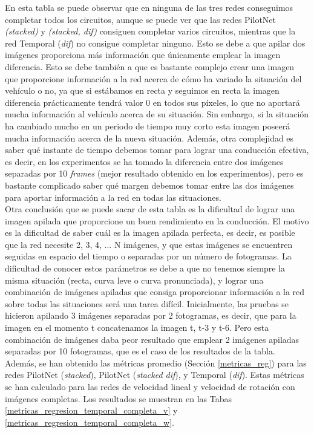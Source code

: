 En esta tabla se puede observar que en ninguna de las tres redes conseguimos completar todos los circuitos, aunque se puede ver que las redes PilotNet \textit{(stacked)} y \textit{(stacked, dif)} consiguen completar varios circuitos, mientras que la red Temporal (\textit{dif}) no consigue completar ninguno. Esto se debe a que apilar dos imágenes proporciona más información que únicamente emplear la imagen diferencia. Esto se debe también a que es bastante complejo crear una imagen que proporcione información a la red acerca de cómo ha variado la situación del vehículo o no, ya que si estábamos en recta y seguimos en recta la imagen diferencia prácticamente tendrá valor 0 en todos sus píxeles, lo que no aportará mucha información al vehículo acerca de su situación. Sin embargo, si la situación ha cambiado mucho en un periodo de tiempo muy corto esta imagen poseerá mucha información acerca de la nueva situación. Además, otra complejidad es saber qué instante de tiempo debemos tomar para lograr una conducción efectiva, es decir, en los experimentos se ha tomado la diferencia entre dos imágenes separadas por 10 \textit{frames} (mejor resultado obtenido en los experimentos), pero es bastante complicado saber qué margen debemos tomar entre las dos imágenes para aportar información a la red en todas las situaciones.\\


Otra conclusión que se puede sacar de esta tabla es la dificultad de lograr una imagen apilada que proporcione un buen rendimiento en la conducción. El motivo es la dificultad de saber cuál es la imagen apilada perfecta, es decir, es posible que la red necesite 2, 3, 4, ... N imágenes, y que estas imágenes se encuentren seguidas en espacio del tiempo o separadas por un número de fotogramas. La dificultad de conocer estos parámetros se debe a que no tenemos siempre la misma situación (recta, curva leve o curva pronunciada), y lograr una combinación de imágenes apiladas que consiga proporcionar información a la red sobre todas las situaciones será una tarea difícil. Inicialmente, las pruebas se hicieron apilando 3 imágenes separadas por 2 fotogramas, es decir, que para la imagen en el momento t concatenamos la imagen t, t-3 y t-6. Pero esta combinación de imágenes daba peor resultado que emplear 2 imágenes apiladas separadas por 10 fotogramas, que es el caso de los resultados de la tabla.\\


Además, se han obtenido las métricas promedio (Sección \ref{metricas_reg}) para las redes PilotNet (\textit{stacked}), PilotNet (\textit{stacked dif}), y Temporal (\textit{dif}). Estas métricas se han calculado para las redes de velocidad lineal y velocidad de rotación con imágenes completas. Los resultados se muestran en las Tabas \ref{metricas_regresion_temporal_completa_v} y \ref{metricas_regresion_temporal_completa_w}.\\

